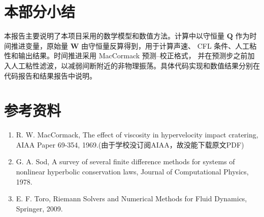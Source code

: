 \section{本部分小结}

本报告主要说明了本项目采用的数学模型和数值方法。计算中以守恒量
\(\bm Q\) 作为时间推进变量，原始量 \(\bm W\) 由守恒量反算得到，用于计算声速、
CFL 条件、人工粘性和输出结果。时间推进采用 MacCormack 预测--校正格式，
并在预测步之前加入人工粘性滤波，以减弱间断附近的非物理振荡。具体代码实现和数值结果分别在代码报告和结果报告中说明。

\section*{参考资料}

\begin{enumerate}[leftmargin=2em]
    \item R. W. MacCormack, The effect of viscosity in hypervelocity impact cratering, AIAA Paper 69-354, 1969.(由于学校没订阅AIAA，故没能下载原文PDF)
    \item G. A. Sod, A survey of several finite difference methods for systems of nonlinear hyperbolic conservation laws, Journal of Computational Physics, 1978.
    \item E. F. Toro, Riemann Solvers and Numerical Methods for Fluid Dynamics, Springer, 2009.
\end{enumerate}
